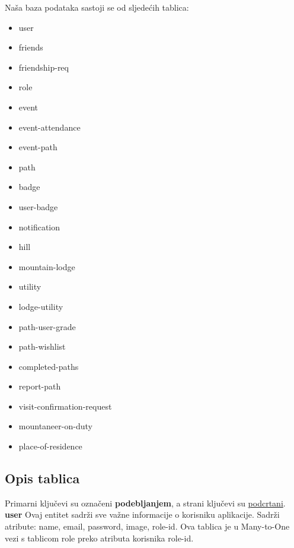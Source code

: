 	Naša baza podataka sastoji se od sljedećih tablica:
		\begin{itemize}[noitemsep]
		\item
			user
		\item
			friends
		\item
			friendship-req
		\item
			role
		\item
			event
		\item
			event-attendance
		\item
			event-path
		\item
			path
		\item
			badge
		\item
			user-badge
		\item
			notification
		\item
			hill
		\item
			mountain-lodge
		\item
			utility
		\item
			lodge-utility
		\item
			path-user-grade
		\item
			path-wishlist
		\item
			completed-paths
		\item
			report-path
		\item
			visit-confirmation-request
		\item
			mountaneer-on-duty
		\item
			place-of-residence	


\end{itemize}
		
		
			\subsection{Opis tablica}
			Primarni ključevi su označeni \textbf{podebljanjem}, a strani ključevi su \underline{podcrtani}. \\
			
			\textbf{user}  Ovaj entitet sadrži sve važne informacije o korisniku aplikacije. Sadrži atribute: name, email, password, image, role-id.  Ova tablica je u Many-to-One vezi s tablicom role preko atributa korisnika role-id.
			
